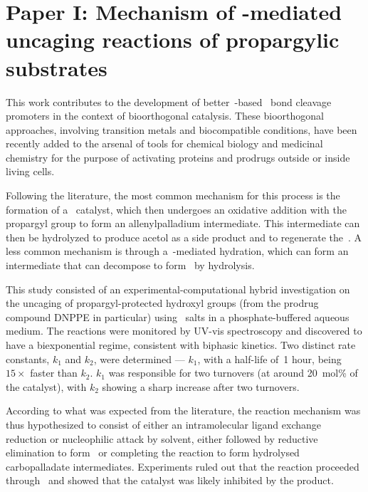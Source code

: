 \chapter{Paper I:\@
  Mechanism of -mediated
  \linebreak
  uncaging reactions %
  of propargylic substrates
 }%
\label{ch:paper1}

\begin{citacao}
\end{citacao}

This work contributes to the development of better~-based~ bond cleavage promoters in the context of bioorthogonal catalysis.
These bioorthogonal approaches,
involving transition metals and biocompatible conditions,
have been recently added to the arsenal of tools for chemical biology and medicinal chemistry for the purpose of activating proteins and prodrugs outside or inside living cells.

Following the literature,
the most common mechanism for this process is the formation of a~ catalyst,
which then undergoes an oxidative addition with the propargyl group to form an allenylpalladium intermediate.
This intermediate can then be hydrolyzed to produce acetol as a side product and to regenerate the~.
A less common mechanism is through a~-mediated hydration,
which can form an intermediate that can decompose to form~ by hydrolysis.

This study consisted of an experimental-computational hybrid investigation on the uncaging of propargyl-protected hydroxyl groups (from the prodrug compound DNPPE in particular) using~ salts in a phosphate-buffered aqueous medium.
The reactions were monitored by UV-vis spectroscopy and discovered to have a biexponential regime,
consistent with biphasic kinetics.
Two distinct rate constants,
$k_1$ and $k_2$,
were determined --- $k_1$,
with a half-life of~1 hour,
being $15 \times$ faster than $k_2$.
$k_1$ was responsible for two turnovers (at around 20~mol\% of the catalyst),
with $k_2$ showing a sharp increase after two turnovers.

According to what was expected from the literature,
the reaction mechanism was thus hypothesized to consist of either
an intramolecular ligand exchange reduction
or nucleophilic attack by solvent,
either followed by reductive elimination to form~
or completing the reaction to form hydrolysed carbopalladate intermediates.
Experiments ruled out that the reaction proceeded through~
and showed that the catalyst was likely inhibited by the product.

